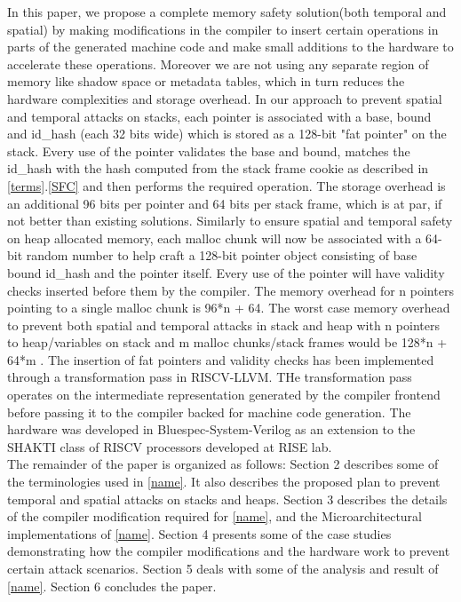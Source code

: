 In this paper, we propose a complete memory safety solution(both temporal and spatial) by making modifications in the compiler to insert certain operations in parts of the generated machine code and make small additions to the hardware to accelerate these operations. Moreover we are not using any separate region of memory like shadow space or metadata tables, which in turn reduces the hardware complexities and storage overhead. In our approach to prevent spatial and temporal attacks on stacks, each pointer is associated with a base, bound and id\_hash (each 32 bits wide) which is stored as a 128-bit "fat pointer" on the stack. Every use of the pointer validates the base and bound, matches the id\_hash with the hash computed from the stack frame cookie as described in \ref{terms}.\ref{SFC} and then performs the required operation.  The storage overhead is an additional 96 bits per pointer and 64 bits per stack frame, which is at par, if not better than existing solutions. Similarly to ensure spatial and temporal safety on heap allocated memory, each malloc chunk will now be associated with a 64-bit random number to help craft a 128-bit pointer object consisting of base bound id\_hash and the pointer itself. Every use of the pointer will have validity checks inserted before them by the compiler. The memory overhead for n pointers pointing to a single malloc chunk is 96*n + 64. The worst case memory overhead to prevent both spatial and temporal attacks in stack and heap with n pointers to heap/variables on stack and m malloc chunks/stack frames would be 128*n + 64*m . The insertion of fat pointers and validity checks has been implemented through a transformation pass in RISCV-LLVM. THe transformation pass operates on the intermediate representation generated by the compiler frontend before passing it to the compiler backed for machine code generation. The hardware was developed in Bluespec-System-Verilog\cite{Bluespec} as an extension to the SHAKTI class of RISCV processors developed at RISE lab.\\

The remainder of the paper is organized as follows: Section 2 describes some of the terminologies used in \ref{name}. It also describes the proposed plan to prevent temporal and spatial attacks on stacks and heaps. Section 3 describes the details of the compiler modification required for \ref{name}, and the Microarchitectural implementations of \ref{name}. Section 4 presents some of the case studies demonstrating how the compiler modifications and the hardware work to prevent certain attack scenarios. Section 5 deals with some of the analysis and  result of \ref{name}. Section 6 concludes the paper.

